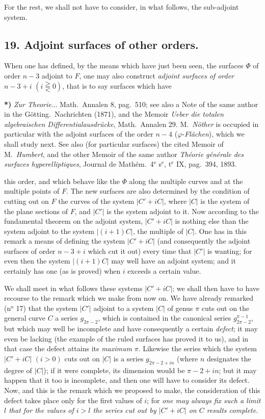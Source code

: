 \documentclass{article}
\begin{document}
For the rest, we shall not have to consider, in what follows, the sub-adjoint system.

\subsection*{19. Adjoint surfaces of other orders.}

When one has defined, by the means which have just been seen, the surfaces $\Phi$ of order $n-3$ adjoint to $F$, one may also construct \emph{adjoint surfaces of order} $n-3+i$ $(i \gtreqqless 0)$, that is to say surfaces which have

\textbf{*)} \emph{Zur Theorie}... Math.\ Annalen 8, pag.\ 510; see also a Note of the same author in the Götting.\ Nachrichten (1871), and the Memoir \emph{Ueber die totalen algebraischen Differentialausdrücke}, Math.\ Annalen 29. M.\ \emph{Nöther} is occupied in particular with the adjoint surfaces of the order $n-4$ ($\varphi$-\emph{Flächen}), which we shall study next. See also (for particular surfaces) the cited Memoir of M.\ \emph{Humbert}, and the other Memoir of the same author \emph{Théorie générale des surfaces hyperelliptiques}, Journal de Mathém.\ 4${}^{\text{e}}$ s${}^{\text{e}}$, t${}^{\text{e}}$ IX, pag.\ 394, 1893.

this order, and which behave like the $\Phi$ along the multiple curves and at the multiple points of $F$. The new surfaces are also determined by the condition of cutting out on $F$ the curves of the system $|C'+iC|$, where $|C|$ is the system of the plane sections of $F$, and $|C'|$ is the system adjoint to it. Now according to the fundamental theorem on the adjoint system, $|C'+iC|$ is nothing else than the system adjoint to the system $|(i+1)C|$, the multiple of $|C|$. One has in this remark a means of defining the system $|C'+iC|$ (and consequently the adjoint surfaces of order $n-3+i$ which cut it out) every time that $|C'|$ is wanting; for even then the system $|(i+1)C|$ may well have an adjoint system; and it certainly has one (as is proved) when $i$ exceeds a certain value.

We shall meet in what follows these systems $|C'+iC|$; we shall then have to have recourse to the remark which we make from now on. We have already remarked (n${}^{\text{o}}$ 17) that the system $|C'|$ adjoint to a system $|C|$ of genus $\pi$ cuts out on the general curve $C$ a series $g_{2\pi-2}$, which is contained in the canonical series $g_{2\pi-2}^{\pi-1}$, but which may well be incomplete and have consequently a certain \emph{defect}; it may even be lacking (the example of the ruled surfaces has proved it to us), and in that case the defect attains its \emph{maximum} $\pi$. Likewise the series which the system $|C'+iC|$ $(i > 0)$ cuts out on $|C|$ is a series $g_{2\pi-2+in}$ (where $n$ designates the degree of $|C|$); if it were complete, its dimension would be $\pi-2+in$; but it may happen that it too is incomplete, and then one will have to consider its defect. Now, and this is the remark which we proposed to make, the consideration of this defect takes place only for the first values of $i$; for \emph{one may always fix such a limit $l$ that for the values of $i > l$ the series cut out by $|C'+iC|$ on $C$ results complete.}
\end{document}

